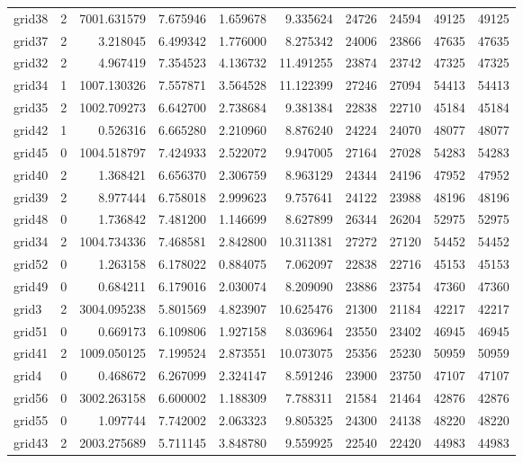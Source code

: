 \begin{longtable}{|l|r|r|r|r|r|r|r|r|r|}
grid38 & 2 & 7001.631579 & 7.675946 & 1.659678 & 9.335624 & 24726 & 24594 & 49125 & 49125 \\
grid37 & 2 & 3.218045 & 6.499342 & 1.776000 & 8.275342 & 24006 & 23866 & 47635 & 47635 \\
grid32 & 2 & 4.967419 & 7.354523 & 4.136732 & 11.491255 & 23874 & 23742 & 47325 & 47325 \\
grid34 & 1 & 1007.130326 & 7.557871 & 3.564528 & 11.122399 & 27246 & 27094 & 54413 & 54413 \\
grid35 & 2 & 1002.709273 & 6.642700 & 2.738684 & 9.381384 & 22838 & 22710 & 45184 & 45184 \\
grid42 & 1 & 0.526316 & 6.665280 & 2.210960 & 8.876240 & 24224 & 24070 & 48077 & 48077 \\
grid45 & 0 & 1004.518797 & 7.424933 & 2.522072 & 9.947005 & 27164 & 27028 & 54283 & 54283 \\
grid40 & 2 & 1.368421 & 6.656370 & 2.306759 & 8.963129 & 24344 & 24196 & 47952 & 47952 \\
grid39 & 2 & 8.977444 & 6.758018 & 2.999623 & 9.757641 & 24122 & 23988 & 48196 & 48196 \\
grid48 & 0 & 1.736842 & 7.481200 & 1.146699 & 8.627899 & 26344 & 26204 & 52975 & 52975 \\
grid34 & 2 & 1004.734336 & 7.468581 & 2.842800 & 10.311381 & 27272 & 27120 & 54452 & 54452 \\
grid52 & 0 & 1.263158 & 6.178022 & 0.884075 & 7.062097 & 22838 & 22716 & 45153 & 45153 \\
grid49 & 0 & 0.684211 & 6.179016 & 2.030074 & 8.209090 & 23886 & 23754 & 47360 & 47360 \\
grid3 & 2 & 3004.095238 & 5.801569 & 4.823907 & 10.625476 & 21300 & 21184 & 42217 & 42217 \\
grid51 & 0 & 0.669173 & 6.109806 & 1.927158 & 8.036964 & 23550 & 23402 & 46945 & 46945 \\
grid41 & 2 & 1009.050125 & 7.199524 & 2.873551 & 10.073075 & 25356 & 25230 & 50959 & 50959 \\
grid4 & 0 & 0.468672 & 6.267099 & 2.324147 & 8.591246 & 23900 & 23750 & 47107 & 47107 \\
grid56 & 0 & 3002.263158 & 6.600002 & 1.188309 & 7.788311 & 21584 & 21464 & 42876 & 42876 \\
grid55 & 0 & 1.097744 & 7.742002 & 2.063323 & 9.805325 & 24300 & 24138 & 48220 & 48220 \\
grid43 & 2 & 2003.275689 & 5.711145 & 3.848780 & 9.559925 & 22540 & 22420 & 44983 & 44983 \\

\end{longtable}
